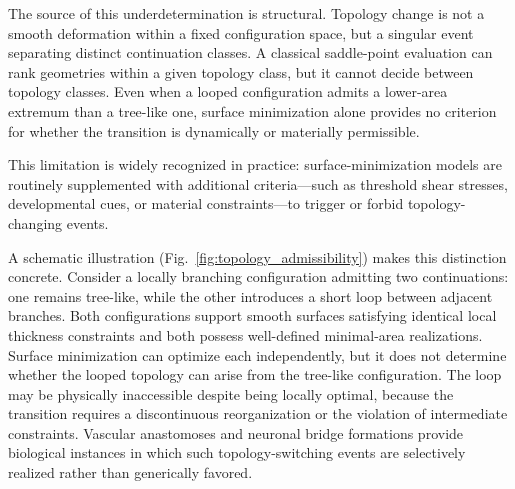 The source of this underdetermination is structural. Topology change is not a smooth deformation within a fixed configuration space, but a singular event separating distinct continuation classes. A classical saddle-point evaluation can rank geometries within a given topology class, but it cannot decide between topology classes. Even when a looped configuration admits a lower-area extremum than a tree-like one, surface minimization alone provides no criterion for whether the transition is dynamically or materially permissible.

This limitation is widely recognized in practice: surface-minimization models are routinely supplemented with additional criteria---such as threshold shear stresses\cite{Bentley2014}, developmental cues, or material constraints---to trigger or forbid topology-changing events.\cite{Ronellenfitsch2015}

A schematic illustration (Fig.~\ref{fig:topology_admissibility}) makes this distinction concrete. Consider a locally branching configuration admitting two continuations: one remains tree-like, while the other introduces a short loop between adjacent branches. Both configurations support smooth surfaces satisfying identical local thickness constraints and both possess well-defined minimal-area realizations. Surface minimization can optimize each independently, but it does not determine whether the looped topology can arise from the tree-like configuration. The loop may be physically inaccessible despite being locally optimal, because the transition requires a discontinuous reorganization or the violation of intermediate constraints. Vascular anastomoses and neuronal bridge formations provide biological instances in which such topology-switching events are selectively realized rather than generically favored.

